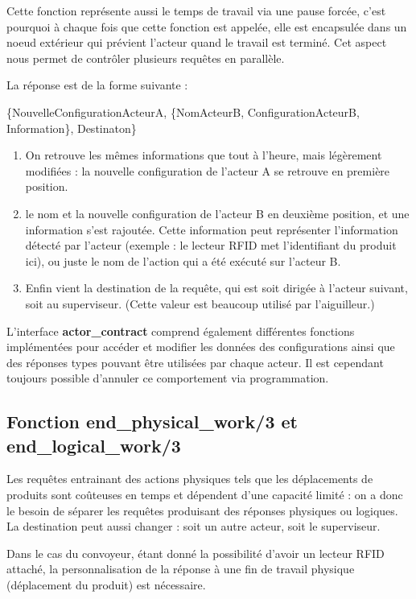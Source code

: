 \documentclass[12pt,a4paper]{article}
\begin{document}
	 	Cette fonction représente aussi le temps de travail via une pause
	 	forcée, c'est pourquoi à chaque fois que cette fonction est appelée,
	 	elle est encapsulée dans un noeud extérieur qui prévient l'acteur 
	 	quand le travail est terminé. Cet aspect nous permet de contrôler 
	 	plusieurs requêtes en parallèle.

	 	La réponse est de la forme suivante :

	 	\{NouvelleConfigurationActeurA, 
	 	\{NomActeurB, ConfigurationActeurB, Information\},
	 	Destinaton\}

	 	\begin{enumerate}
	 		\item On retrouve les mêmes informations que tout à l'heure, mais 
	 			légèrement modifiées : la nouvelle configuration de l'acteur A 
	 			se retrouve en première position.
	 		\item le nom et la nouvelle configuration de l'acteur B en deuxième 
	 			position, et une information s'est rajoutée. Cette information 
	 			peut représenter l'information détecté par l'acteur (exemple : 
	 			le lecteur RFID met l'identifiant du produit ici), ou juste le 
	 			nom de l'action qui a été exécuté sur l'acteur B.
	 		\item Enfin vient la destination de la requête, qui est soit dirigée 
	 			à l'acteur suivant, soit au superviseur. (Cette valeur est 
	 			beaucoup utilisé par l'aiguilleur.)
	 	\end{enumerate}

		L'interface \textbf{actor\_contract} comprend également différentes 
		fonctions implémentées pour accéder et modifier les données des 
		configurations ainsi que des réponses types pouvant être utilisées 
		par chaque acteur. Il est cependant toujours possible d'annuler ce 
		comportement via programmation.

	\subsection*{Fonction end\_physical\_work/3 et end\_logical\_work/3}
		Les requêtes entrainant des actions physiques tels que les déplacements
		de produits sont coûteuses en temps et dépendent d'une capacité limité :
		on a donc le besoin de séparer les requêtes produisant des réponses 
		physiques ou logiques.
		La destination peut aussi changer : soit un autre acteur, soit le 
		superviseur.

		Dans le cas du convoyeur, étant donné la possibilité d'avoir un lecteur
		RFID attaché, la personnalisation de la réponse à une fin de travail physique 
		(déplacement du produit) est nécessaire.
\end{document}
